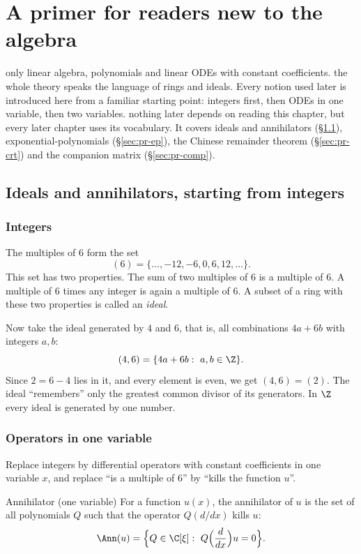 \chapter{A primer for readers new to the algebra}\label{ch:primer}
\chapterbrief
{only linear algebra, polynomials and linear ODEs with constant coefficients.}
{the whole theory speaks the language of rings and ideals. Every notion used later is introduced here from a familiar starting point: integers first, then ODEs in one variable, then two variables.}
{nothing later depends on reading this chapter, but every later chapter uses its vocabulary. It covers ideals and annihilators (\S\ref{sec:pr-ideal}), exponential-polynomials (\S\ref{sec:pr-ep}), the Chinese remainder theorem (\S\ref{sec:pr-crt}) and the companion matrix (\S\ref{sec:pr-comp}).}

\section{Ideals and annihilators, starting from integers}\label{sec:pr-ideal}

\subsection{Integers}

The multiples of $6$ form the set
\[
(6)=\{\dots,-12,-6,0,6,12,\dots\}.
\]
This set has two properties. The sum of two multiples of $6$ is a multiple of $6$. A multiple of $6$ times any integer is again a multiple of $6$. A subset of a ring with these two properties is called an \emph{ideal}.

Now take the ideal generated by $4$ and $6$, that is, all combinations $4a+6b$ with integers $a,b$:
\[
(4,6)=\{4a+6b:\ a,b\in\Z\}.
\]
Since $2=6-4$ lies in it, and every element is even, we get $(4,6)=(2)$. The ideal ``remembers'' only the greatest common divisor of its generators. In $\Z$ every ideal is generated by one number.

\subsection{Operators in one variable}

Replace integers by differential operators with constant coefficients in one variable $x$, and replace ``is a multiple of $6$'' by ``kills the function $u$''.

\begin{definition}{Annihilator (one variable)}
For a function $u(x)$, the annihilator of $u$ is the set of all polynomials $Q$ such that the operator $Q(d/dx)$ kills $u$:
\[
\Ann(u)=\Big\{Q\in\C[\xi]:\ Q\Big(\frac{d}{dx}\Big)u=0\Big\}.
\]
\end{definition}

